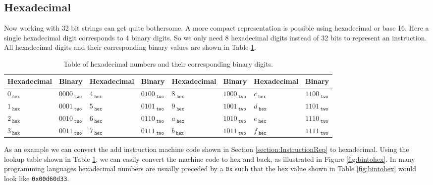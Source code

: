         \subsection{Hexadecimal}
            Now working with 32 bit strings can get quite bothersome. A more compact representation is possible using hexadecimal or base 16. Here a single hexadecimal digit corresponds to 4 binary digits. So we only need 8 hexadecimal digits instead of 32 bits to represent an instruction. All hexadecimal digits and their corresponding binary values are shown in Table \ref{table:Hexadecimal}. 
            
            \begin{table}[h!]
                \centering
                \begin{tabular}{|l|l||l|l||l|l||l|l|}
                	\hline
                	Hexadecimal           & Binary                   & Hexadecimal           & Binary                   & Hexadecimal           & Binary                   & Hexadecimal           & Binary                   \\ \hline
                	$0_{\; \texttt{hex}}$ & $0000_{\; \texttt{two}}$ & $4_{\; \texttt{hex}}$ & $0100_{\; \texttt{two}}$ & $8_{\; \texttt{hex}}$ & $1000_{\; \texttt{two}}$ & $c_{\; \texttt{hex}}$ & $1100_{\; \texttt{two}}$ \\
                	$1_{\; \texttt{hex}}$ & $0001_{\; \texttt{two}}$ & $5_{\; \texttt{hex}}$ & $0101_{\; \texttt{two}}$ & $9_{\; \texttt{hex}}$ & $1001_{\; \texttt{two}}$ & $d_{\; \texttt{hex}}$ & $1101_{\; \texttt{two}}$ \\
                	$2_{\; \texttt{hex}}$ & $0010_{\; \texttt{two}}$ & $6_{\; \texttt{hex}}$ & $0110_{\; \texttt{two}}$ & $a_{\; \texttt{hex}}$ & $1010_{\; \texttt{two}}$ & $e_{\; \texttt{hex}}$ & $1110_{\; \texttt{two}}$ \\
                	$3_{\; \texttt{hex}}$ & $0011_{\; \texttt{two}}$ & $7_{\; \texttt{hex}}$ & $0111_{\; \texttt{two}}$ & $b_{\; \texttt{hex}}$ & $1011_{\; \texttt{two}}$ & $f_{\; \texttt{hex}}$ & $1111_{\; \texttt{two}}$ \\ \hline
                \end{tabular}
                \caption{Table of hexadecimal numbers and their corresponding binary digits.}
                \label{table:Hexadecimal}
            \end{table}
        
            As an example we can convert the add instruction machine code shown in Section \ref{section:InstructionRep} to hexadecimal. Using the lookup table shown in Table \ref{table:Hexadecimal}, we can easily convert the machine code to hex and back, as illustrated in Figure \ref{fig:bintohex}. In many programming languages hexadecimal numbers are usually preceded by a \texttt{0x} such that the hex value shown in Table \ref{fig:bintohex} would look like \texttt{0x00d60d33}.
            
